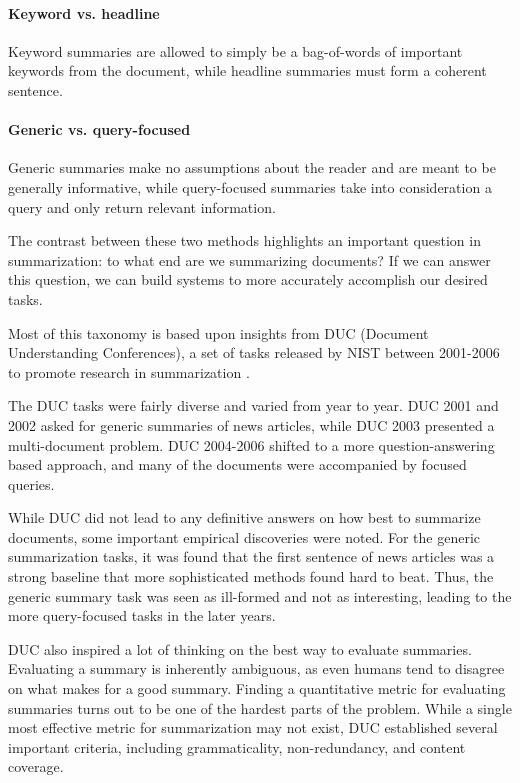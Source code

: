 \documentclass[12pt]{report}
\begin{document}
\paragraph{Keyword vs. headline} Keyword summaries are allowed to simply be a bag-of-words of important keywords from the document, while headline summaries must form a coherent sentence.

\paragraph{Generic vs. query-focused} Generic summaries make no assumptions about the reader and are meant to be generally informative, while query-focused summaries take into consideration a query and only return relevant information.

The contrast between these two methods highlights an important question in summarization: to what end are we summarizing documents? If we can answer this question, we can build systems to more accurately accomplish our desired tasks.

\vspace{0.5cm}


Most of this taxonomy is based upon insights from DUC (Document Understanding Conferences), a set of tasks released by NIST between 2001-2006 to promote research in summarization \citep{over2007duc}.

The DUC tasks were fairly diverse and varied from year to year. DUC 2001 and 2002 asked for generic summaries of news articles, while DUC 2003 presented a multi-document problem. DUC 2004-2006 shifted to a more question-answering based approach, and many of the documents were accompanied by focused queries.

While DUC did not lead to any definitive answers on how best to summarize documents, some important empirical discoveries were noted.
For the generic summarization tasks, it was found that the first sentence of news articles was a strong baseline that more sophisticated methods found hard to beat. Thus, the generic summary task was seen as ill-formed and not as interesting, leading to the more query-focused tasks in the later years.


DUC also inspired a lot of thinking on the best way to evaluate summaries. Evaluating a summary is inherently ambiguous, as even humans tend to disagree on what makes for a good summary.
Finding a quantitative metric for evaluating summaries turns out to be one of the hardest parts of the problem. While a single most effective metric for summarization may not exist, DUC established several important criteria, including grammaticality, non-redundancy, and content coverage.
\end{document}
